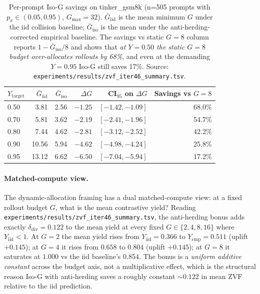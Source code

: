 \documentclass{article}
\begin{document}
\begin{table}[htbp]
\centering\small
\setlength{\tabcolsep}{4pt}
\begin{tabular}{lrrrrr}
\hline
$Y_{\mathrm{target}}$ & $\bar G_{\mathrm{iid}}$ & $\bar G_{\mathrm{iso}}$ &
$\Delta G$ & CI$_{95}$ on $\Delta G$ & Savings vs $G{=}8$ \\
\hline
0.50 & 3.81 & 2.56 & $-1.25$ & $[-1.42, -1.09]$ & 68.0\% \\
0.70 & 5.81 & 3.62 & $-2.19$ & $[-2.41, -1.96]$ & 54.7\% \\
0.80 & 7.44 & 4.62 & $-2.81$ & $[-3.12, -2.52]$ & 42.2\% \\
0.90 & 10.56 & 5.94 & $-4.62$ & $[-4.98, -4.24]$ & 25.8\% \\
0.95 & 13.12 & 6.62 & $-6.50$ & $[-7.04, -5.94]$ & 17.2\% \\
\hline
\end{tabular}
\caption{Per-prompt Iso-G savings on tinker\_gsm8k (n=505 prompts with
$p_x \in (0.05, 0.95)$, $G_{\max}{=}32$). $\bar G_{\mathrm{iid}}$ is the
mean minimum $G$ under the iid collision baseline; $\bar G_{\mathrm{iso}}$
is the mean under the anti-herding-corrected empirical baseline. The
savings vs static $G{=}8$ column reports $1 - \bar G_{\mathrm{iso}}/8$
and shows that \emph{at $Y{=}0.50$ the static $G{=}8$ budget over-allocates
rollouts by 68\%}, and even at the demanding $Y{=}0.95$ Iso-G still
saves 17\%. Source: \texttt{experiments/results/zvf_iter46_summary.tsv}.}
\label{tab:zvf-isog-savings}
\end{table}

\paragraph{Matched-compute view.}
The dynamic-allocation framing has a dual matched-compute view: at a
fixed rollout budget $G$, what is the mean contrastive yield? Reading
\texttt{experiments/results/zvf_iter46_summary.tsv}, the anti-herding
bonus adds exactly $\delta_{\mathrm{div}} = 0.122$ to the mean yield
at every fixed $G \in \{2, 4, 8, 16\}$ where $Y_{\mathrm{iid}} < 1$.
At $G{=}2$ the mean yield rises from $Y_{\mathrm{iid}}{=}0.366$ to
$Y_{\mathrm{emp}}{=}0.511$ (uplift $+0.145$); at $G{=}4$ it rises
from $0.658$ to $0.804$ (uplift $+0.145$); at $G{=}8$ it saturates
at $1.000$ vs the iid baseline's $0.854$. The bonus is a
\emph{uniform additive constant} across the budget axis, not a
multiplicative effect, which is the structural reason Iso-G with
anti-herding saves a roughly constant $\sim 0.122$ in mean ZVF
relative to the iid prediction.
\end{document}
